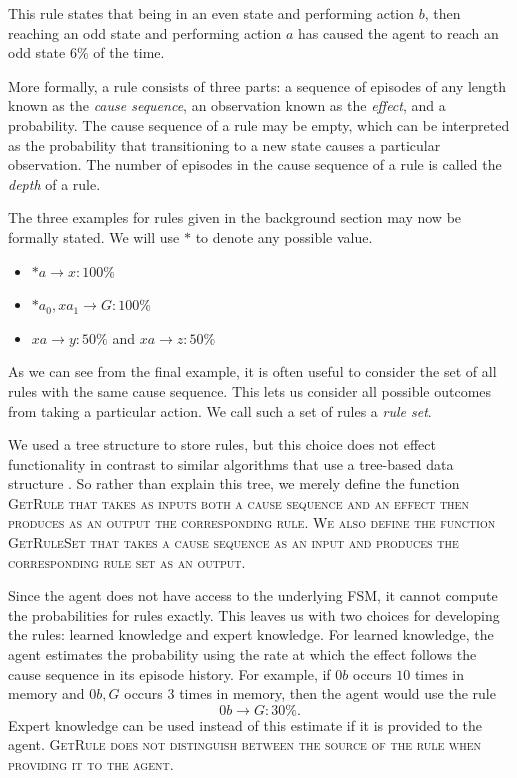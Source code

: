 \documentclass[letterpaper]{article} %
\begin{document}
This rule states that being in an even state and performing action
$b$, then reaching an odd state and performing action $a$ has caused
the agent to reach an odd state $6\%$ of the time.


More formally, a rule consists of three parts: a sequence of episodes of any length known as the \emph{cause sequence}, an observation known as the \emph{effect}, and a probability. The cause sequence of a rule may be empty, which can be interpreted as the probability  that transitioning to a new state causes a particular observation. The number of episodes in the cause sequence of a rule is called the \textit{depth} of a rule.

The three examples for rules given in the background section may now be formally stated. We will use $*$ to denote any possible value.
\begin{itemize}
	\item $*a \rightarrow x: 100\%$
	\item $*a_0, xa_1 \rightarrow G: 100\%$
	\item $xa \rightarrow y: 50\%$ and $xa \rightarrow z: 50\%$
\end{itemize}

As we can see from the final example, it is often useful to consider
the set of all rules with the same cause sequence. This lets us
consider all possible outcomes from taking a particular action. We
call such a set of rules a \textit{rule set}.

We used a tree structure to store rules, but this choice does not
effect functionality in contrast to similar algorithms that use a
tree-based data structure \cite{McCallumUSM95,Shani2005}. So rather
than explain this tree, we merely define the function \scshape
GetRule \normalfont that takes as inputs both a cause sequence and an
effect then produces as an output the corresponding rule. We also
define the function \scshape GetRuleSet \normalfont that takes a
cause sequence as an input and produces the corresponding rule set
as an output.

Since the agent does not have access to the underlying FSM, it cannot
compute the probabilities for rules exactly. This leaves us with two
choices for developing the rules: learned knowledge and expert
knowledge. For learned knowledge, the agent estimates the probability
using the rate at which the effect follows the cause sequence in its
episode history. For example, if $0b$ occurs $10$ times in memory and
$0b,G$ occurs $3$ times in memory, then the agent would use the
rule $$0b \rightarrow G: 30\%.$$ Expert knowledge can be used instead
of this estimate if it is provided to the agent. \scshape
GetRule \normalfont does not distinguish between the source of the
rule when providing it to the agent.
\end{document}
